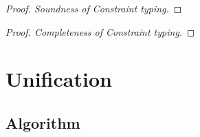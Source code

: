 \documentclass[8pt]{beamer}
\begin{document}
\begin{frame}
    \begin{proof}[Proof. Soundness of Constraint typing]
    \end{proof}
\end{frame}

\begin{frame}
    \begin{proof}[Proof. Completeness of Constraint typing]
    \end{proof}
\end{frame}

\section{Unification}
\subsection{Algorithm}
\end{document}
